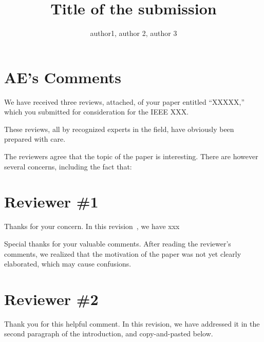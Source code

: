 \documentclass{ar2rc}
\title{Title of the submission}
\author{author1, author 2, author 3}
\begin{document}
\maketitle

\section*{AE's Comments}
We have received three reviews, attached, of your paper entitled 
``XXXXX,'' 
which you submitted for consideration for the IEEE XXX.

These reviews, all by recognized experts in the field, have obviously been prepared with care.

The reviewers agree that the topic of the paper is interesting. There are however several concerns, including the fact that:

\RC
\lipsum[1]

\AR
\blindtext



\section{Reviewer \#1}


\RC
\blindtext

\AR 
Thanks for your concern.
In this revision~\citep{BJL11J01}, 
we have xxx




\RC 
\blindtext

\AR 
Special thanks for your valuable comments.
After reading the reviewer's comments, 
we realized that the motivation of the paper was not yet clearly elaborated, 
which may cause confusions.

\blindmathpaper



\gliMarker %

\section{Reviewer \#2}

\RC 
\lipsum[1]


\AR
Thank you for this helpful comment. In this revision,
we have addressed it in the second paragraph of the introduction, and copy-and-pasted below.


\begin{quote}
{

\lipsum[1]
}

\end{quote}
\end{document}
